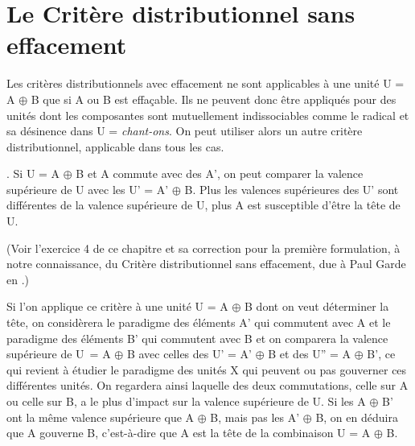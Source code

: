 \section{Le Critère distributionnel sans effacement}\label{sec:3.3.13}

Les critères distributionnels avec effacement ne sont applicables à une unité U = A ${\oplus}$ B que si A ou B est effaçable. Ils ne peuvent donc être appliqués pour des unités dont les composantes sont mutuellement indissociables comme le radical et sa désinence dans U = \textit{chant-ons}. On peut utiliser alors un autre critère distributionnel, applicable dans tous les cas.\largerpage

{. Si U = A ${\oplus}$ B et A commute avec des A', on peut comparer la valence supérieure de U avec les U’ = A’ ${\oplus}$ B. Plus les valences supérieures des U' sont différentes de la valence supérieure de U, plus A est susceptible d'être la tête de U.}

\noindent (Voir l’exercice 4 de ce chapitre et sa correction pour la première formulation, à notre connaissance, du Critère distributionnel sans effacement, due à Paul Garde en \citeyear{garde1977ordre}.) 

Si l’on applique ce critère à une unité U = A ${\oplus}$ B dont on veut déterminer la tête, on considèrera le paradigme des éléments A’ qui commutent avec A et le paradigme des éléments B’ qui commutent avec B et on comparera la valence supérieure de U~= A ${\oplus}$ B avec celles des U’ = A’ ${\oplus}$ B et des U” = A ${\oplus}$ B’, ce qui revient à étudier le paradigme des unités X qui peuvent ou pas gouverner ces différentes unités.
On regardera ainsi laquelle des deux commutations, celle sur A ou celle sur B, a le plus d’impact sur la valence supérieure de U. Si les A ${\oplus}$ B’ ont la même valence supérieure que A ${\oplus}$ B, mais pas les A’ ${\oplus}$ B, on en déduira que A gouverne B, c’est-à-dire que A est la tête de la combinaison U = A ${\oplus}$ B.%

